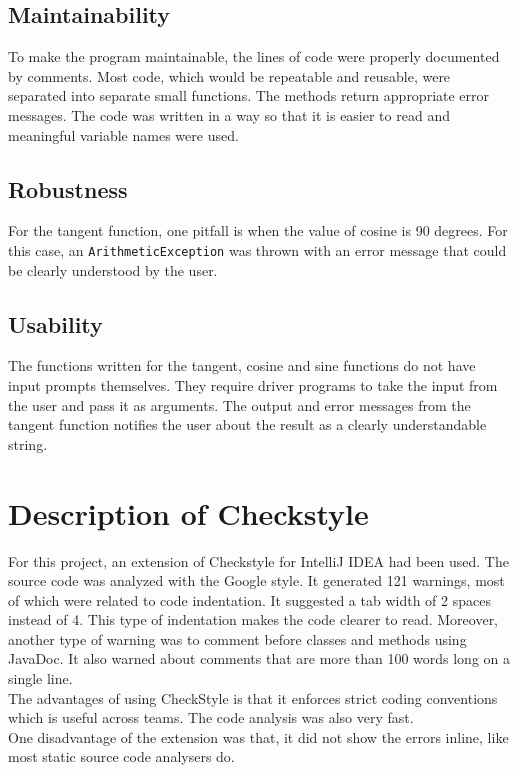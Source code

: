 \documentclass[12pt]{article}
\begin{document}
\subsection{Maintainability}
To make the program maintainable, the lines of code were properly documented by comments. Most code, which would be repeatable and reusable, were separated into separate small functions. The methods return appropriate error messages. The code was written in a way so that it is easier to read and meaningful variable names were used.
\subsection{Robustness}
For the tangent function, one pitfall is when the value of cosine is 90 degrees. For this case, an \texttt{ArithmeticException} was thrown with an error message that could be clearly understood by the user.
\subsection{Usability}
The functions written for the tangent, cosine and sine functions do not have input prompts themselves. They require driver programs to take the input from the user and pass it as arguments. The output and error messages from the tangent function notifies the user about the result as a clearly understandable string.
\section{Description of Checkstyle}
For this project, an extension of Checkstyle for IntelliJ IDEA had been used. The source code was analyzed with the Google style. It generated 121 warnings, most of which were related to code indentation. It suggested a tab width of 2 spaces instead of 4. This type of indentation makes the code clearer to read. Moreover, another type of warning was to comment before classes and methods using JavaDoc. It also warned about comments that are more than 100 words long on a single line. \\
The advantages of using CheckStyle is that it enforces strict coding conventions which is useful across teams. The code analysis was also very fast. \\
One disadvantage of the extension was that, it did not show the errors inline, like most static source code analysers do.
\end{document}
